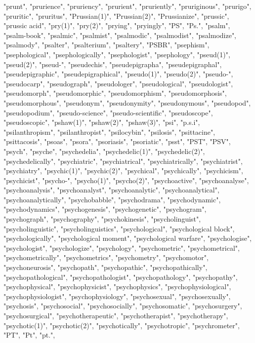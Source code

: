 "prunt",
"prurience",
"pruriency",
"prurient",
"pruriently",
"pruriginous",
"prurigo",
"pruritic",
"pruritus",
"Prussian(1)",
"Prussian(2)",
"Prussianize",
"prussic",
"prussic acid",
"pry(1)",
"pry(2)",
"prying",
"pryingly",
"PS",
"Ps.",
"psalm",
"psalm-book",
"psalmic",
"psalmist",
"psalmodic",
"psalmodist",
"psalmodize",
"psalmody",
"psalter",
"psalterium",
"psaltery",
"PSBR",
"psephism",
"psephological",
"psephologically",
"psephologist",
"psephology",
"pseud(1)",
"pseud(2)",
"pseud-",
"pseudechis",
"pseudepigrapha",
"pseudepigraphal",
"pseudepigraphic",
"pseudepigraphical",
"pseudo(1)",
"pseudo(2)",
"pseudo-",
"pseudocarp",
"pseudograph",
"pseudologer",
"pseudological",
"pseudologist",
"pseudomorph",
"pseudomorphic",
"pseudomorphism",
"pseudomorphosis",
"pseudomorphous",
"pseudonym",
"pseudonymity",
"pseudonymous",
"pseudopod",
"pseudopodium",
"pseudo-science",
"pseudo-scientific",
"pseudoscope",
"pseudoscopic",
"pshaw(1)",
"pshaw(2)",
"pshaw(3)",
"psi",
"p.s.i",
"psilanthropism",
"psilanthropist",
"psilocybin",
"psilosis",
"psittacine",
"psittacosis",
"psoas",
"psora",
"psoriasis",
"psoriatic",
"psst",
"PST",
"PSV",
"psych",
"psyche",
"psychedelia",
"psychedelic(1)",
"psychedelic(2)",
"psychedelically",
"psychiatric",
"psychiatrical",
"psychiatrically",
"psychiatrist",
"psychiatry",
"psychic(1)",
"psychic(2)",
"psychical",
"psychically",
"psychicism",
"psychicist",
"psycho-",
"psycho(1)",
"psycho(2)",
"psychoactive",
"psychoanalyse",
"psychoanalysis",
"psychoanalyst",
"psychoanalytic",
"psychoanalytical",
"psychoanalytically",
"psychobabble",
"psychodrama",
"psychodynamic",
"psychodynamics",
"psychogenesis",
"psychogenetic",
"psychogram",
"psychograph",
"psychography",
"psychokinesis",
"psycholinguist",
"psycholinguistic",
"psycholinguistics",
"psychological",
"psychological block",
"psychologically",
"psychological moment",
"psychological warfare",
"psychologise",
"psychologist",
"psychologize",
"psychology",
"psychometric",
"psychometrical",
"psychometrically",
"psychometrics",
"psychometry",
"psychomotor",
"psychoneurosis",
"psychopath",
"psychopathic",
"psychopathically",
"psychopathological",
"psychopathologist",
"psychopathology",
"psychopathy",
"psychophysical",
"psychophysicist",
"psychophysics",
"psychophysiological",
"psychophysiologist",
"psychophysiology",
"psychosexual",
"psychosexually",
"psychosis",
"psychosocial",
"psychosocially",
"psychosomatic",
"psychosurgery",
"psychosurgical",
"psychotherapeutic",
"psychotherapist",
"psychotherapy",
"psychotic(1)",
"psychotic(2)",
"psychotically",
"psychotropic",
"psychrometer",
"PT",
"Pt",
"pt.",
